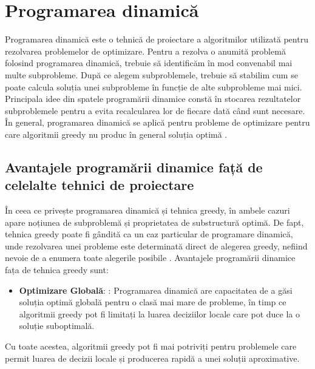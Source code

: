 

\lstset{style=mystyle}

\chapter{Programarea dinamică}
Programarea dinamică este o tehnică de proiectare a algoritmilor utilizată pentru rezolvarea problemelor de optimizare.
Pentru a rezolva o anumită problemă folosind programarea dinamică, trebuie să identificăm în mod convenabil mai multe subprobleme.
După ce alegem subproblemele, trebuie să stabilim cum se poate calcula soluția unei subprobleme în funcție de alte subprobleme mai mici.
Principala idee din spatele programării dinamice constă în stocarea rezultatelor subproblemele pentru a evita recalcularea lor de fiecare dată când sunt necesare. În general, programarea dinamică se aplică pentru probleme de optimizare pentru care algoritmii greedy nu produc în general soluția optimă \cite{Curs}. 

\section{Avantajele programării dinamice față de celelalte tehnici de proiectare}
În ceea ce privește programarea dinamică și tehnica greedy, 
în ambele cazuri apare noțiunea de subproblemă și proprietatea de substructură optimă. De fapt, tehnica greedy poate fi gândită ca un caz particular de programare dinamică, unde rezolvarea unei probleme este determinată direct de alegerea greedy, nefiind nevoie de a
enumera toate alegerile posibile \cite{Curs}. Avantajele programării dinamice fața de tehnica greedy sunt:
\begin{itemize}
  \item \textbf {Optimizare Globală}: : Programarea dinamică are capacitatea de a găsi soluția optimă globală pentru o clasă mai mare de probleme, în timp ce algoritmii greedy pot fi limitați la luarea deciziilor locale care pot duce la o soluție suboptimală.
  
\end{itemize}
Cu toate acestea, algoritmii greedy pot fi mai potriviți pentru problemele care permit luarea de decizii locale și producerea rapidă a unei soluții aproximative.


